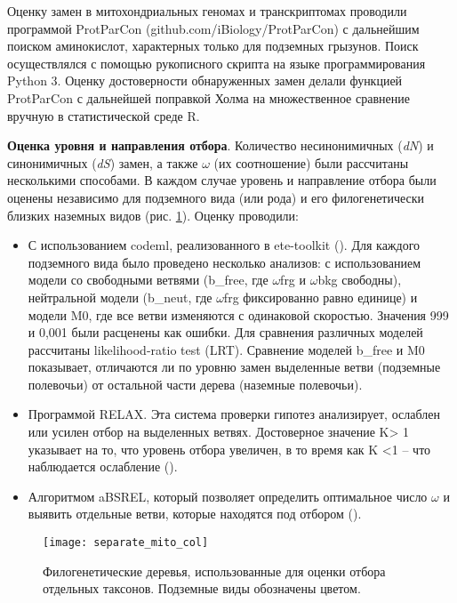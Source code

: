 Оценку замен в митохондриальных геномах и транскриптомах проводили программой ProtParCon (github.com/iBiology/ProtParCon) с дальнейшим поиском аминокислот, характерных только для подземных грызунов. Поиск осуществлялся с помощью рукописного скрипта на языке программирования Python 3. Оценку достоверности обнаруженных замен делали функцией ProtParCon с дальнейшей поправкой Холма на множественное сравнение вручную в статистической среде R. 

\textbf{Оценка уровня и направления отбора}. Количество несинонимичных (\textit{dN}) и синонимичных (\textit{dS}) замен, а также $\omega$ (их соотношение) были рассчитаны несколькими способами. В каждом случае уровень и направление отбора были оценены независимо для подземного вида (или рода) и его филогенетически близких наземных видов (рис. \ref{tree_mito}). Оценку проводили: 
\begin{itemize}
	\item[\textbullet] С использованием codeml, реализованного в ete-toolkit (\cite{Huerta-Cepas2016}). Для каждого подземного вида было проведено несколько анализов: с использованием модели со свободными ветвями (b\_free, где $\omega$frg и $\omega$bkg свободны), нейтральной модели (b\_neut, где $\omega$frg фиксированно равно единице) и модели M0, где все ветви изменяются с одинаковой скоростью. Значения 999 и 0,001 были расценены как ошибки. Для сравнения различных моделей рассчитаны likelihood-ratio test (LRT). Сравнение моделей b\_free и M0 показывает, отличаются ли по уровню замен выделенные ветви (подземные полевочьи) от остальной части дерева (наземные полевочьи). 
	\item[\textbullet] Программой RELAX. Эта система проверки гипотез анализирует, ослаблен или усилен отбор на выделенных ветвях. Достоверное значение K> 1 указывает на то, что уровень отбора увеличен, в то время как K <1 -- что наблюдается ослабление (\cite{Wertheim2015}).
	\item[\textbullet] Алгоритмом aBSREL, который позволяет определить оптимальное число $\omega$ и выявить отдельные ветви, которые находятся под отбором (\cite{Smith2015}).     
\end{itemize}

\begin{figure}[h!]
	\begin{center}
		\texttt{[image: separate\_mito\_col]}
	\end{center}
	\caption{Филогенетические деревья, использованные для оценки отбора отдельных таксонов. Подземные виды обозначены цветом.}
	\label{tree_mito}
\end{figure}

